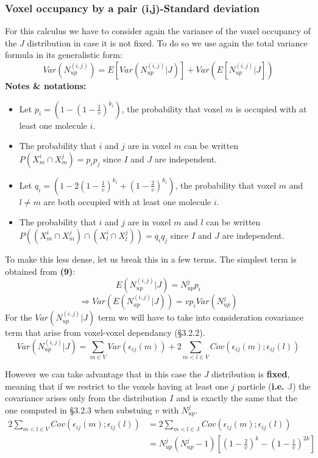 \documentclass{article}
\begin{document}
\subsubsection{Voxel occupancy by a pair (i,j)-Standard deviation}
For this calculus we have to consider again the variance of the voxel occupancy of the $J$ distribution in case it is not fixed. To do so we use again
the total variance formula in its generalistic form:
\[
    Var(N^{(i,j)}_{up}) = E[Var(N^{(i,j)}_{up}|J)] + Var(E[N^{(i,j)}_{up}|J])
\]
\textbf{Notes \& notations:}
\begin{itemize}
    \item Let $p_i = (1-{(1-\frac{1}{v})}^{k_i})$, the probability that voxel $m$ is occupied with at least one molecule $i$.
    \item The probability that $i$ and $j$ are in voxel $m$ can be written $P(X^i_m \cap X^j_m) = p_ip_j$ since $I$ and $J$ are independent.
    \item Let $q_i = (1-2{(1-\frac{1}{v})}^{k_i} + {(1-\frac{2}{v})}^{k_i})$, the probability that voxel $m$ and $l\neq m$ are both occupied with at least
    one molecule $i$.
    \item The probability that $i$ and $j$ are in voxel $m$ and $l$ can be written $P((X^i_m \cap X^j_m) \cap (X^i_l \cap X^j_l)) = q_iq_j$ since $I$ and $J$ are independent.
\end{itemize}

To make this less dense, let us break this in a few terms.\newline
The simplest term is obtained from \textbf{(9)}:
\[
E(N^{(i,j)}_{up}|J) = N^j_{up}p_i
\]
\[
    \Rightarrow Var(E(N^{(i,j)}_{up}|J)) = vp_iVar(N^j_{up})
\]
For the $Var(N^{(i,j)}_{up}|J)$ term we will have to take into consideration covariance term that arise from voxel-voxel dependancy (\S3.2.2). 
\[
    Var(N^{(i,j)}_{up}|J) = \sum_{m\in V}Var(\epsilon_{ij}(m)) + 2\sum_{m < l \in V}Cov(\epsilon_{ij}(m); \epsilon_{ij}(l))
\]

However we can take advantage that in this case the $J$ distribution is \textbf{fixed}, meaning that if we restrict
to the voxels having at least one $j$ particle (\textbf{i.e.} $\mathbb{J}$) the covariance arises only from the distribution $I$ and is exactly the same
that the one computed in \S3.2.3 when substuing $v$ with $N^j_{up}$.
\[\begin{split}
    2\sum_{m < l \in V}Cov(\epsilon_{ij}(m); \epsilon_{ij}(l)) &= 2\sum_{m < l \in \mathbb{J}}Cov(\epsilon_{ij}(m); \epsilon_{ij}(l)) \\
                & = N^j_{up}(N^j_{up}-1)[(1-\frac{2}{v})^k - (1-\frac{1}{v})^{2k}]
\end{split}
\]
\end{document}
